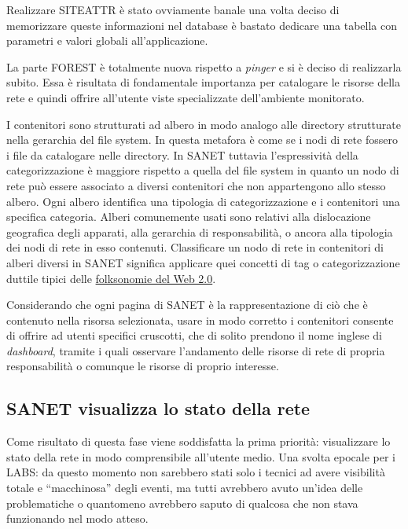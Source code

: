 \documentclass[a4wide,10pt,italian]{manual}
\begin{document}
Realizzare SITEATTR è stato ovviamente banale una volta deciso di memorizzare queste informazioni
nel database è bastato dedicare una tabella con parametri e valori globali all'applicazione.

La parte FOREST è totalmente nuova rispetto a \emph{pinger} e si è deciso di realizzarla subito.
Essa è risultata di fondamentale importanza per catalogare le risorse della rete e quindi offrire all'utente
viste specializzate dell'ambiente monitorato.

I contenitori sono strutturati ad albero in modo analogo alle directory strutturate nella gerarchia del file system. In questa metafora è come se i nodi di rete fossero i file da catalogare nelle directory. In SANET tuttavia l'espressività della categorizzazione è maggiore rispetto a quella del file system in quanto un nodo di rete può essere associato a diversi contenitori che non appartengono allo stesso albero.
Ogni albero identifica una tipologia di categorizzazione e i contenitori una specifica categoria. Alberi comunemente usati sono relativi alla dislocazione geografica degli apparati, alla gerarchia di responsabilità, o ancora alla tipologia dei nodi di rete in esso contenuti.
Classificare un nodo di rete in contenitori di alberi diversi in SANET significa applicare quei concetti di tag o categorizzazione duttile tipici delle \href{http://en.wikipedia.org/wiki/Folksonomy}{folksonomie del Web 2.0}.

Considerando che ogni pagina di SANET è la rappresentazione di ciò che è contenuto nella risorsa selezionata,
usare in modo corretto i contenitori consente di offrire ad utenti specifici cruscotti, che di solito prendono
il nome inglese di \emph{dashboard},  tramite i quali osservare l'andamento delle risorse di rete di propria responsabilità
o comunque le risorse di proprio interesse.


\subsection{SANET visualizza lo stato della rete}

Come risultato di questa fase viene soddisfatta la prima priorità: visualizzare lo stato della rete in modo comprensibile
all'utente medio. Una svolta epocale per i LABS: da questo momento non sarebbero stati solo i tecnici ad avere
visibilità totale e ``macchinosa'' degli eventi, ma tutti avrebbero avuto un'idea delle problematiche
o quantomeno avrebbero saputo di qualcosa che non stava funzionando nel modo atteso.
\end{document}
